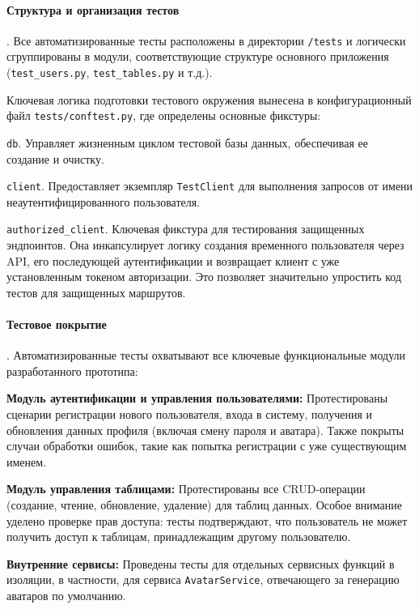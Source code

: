 \paragraph{Структура и организация тестов}. Все автоматизированные тесты расположены в директории
\verb|/tests| и логически сгруппированы в модули, соответствующие структуре основного приложения
(\verb|test_users.py|, \verb|test_tables.py| и т.д.).

Ключевая логика подготовки тестового окружения вынесена в конфигурационный файл
\verb|tests/conftest.py|, где определены основные фикстуры:
\begin{compactitem}
      \item \verb|db|. Управляет жизненным циклом тестовой базы данных, обеспечивая ее создание и
      очистку.
      \item \verb|client|. Предоставляет экземпляр \verb|TestClient| для выполнения запросов от имени
      неаутентифицированного пользователя.
      \item \verb|authorized_client|. Ключевая фикстура для тестирования защищенных эндпоинтов. Она
      инкапсулирует логику создания временного пользователя через API, его последующей аутентификации
      и возвращает клиент с уже установленным токеном авторизации. Это позволяет значительно
      упростить код тестов для защищенных маршрутов.
\end{compactitem}

\paragraph{Тестовое покрытие}. Автоматизированные тесты охватывают все ключевые функциональные модули
разработанного прототипа:
\begin{compactitem}
      \item \textbf{Модуль аутентификации и управления пользователями:} Протестированы сценарии
      регистрации нового пользователя, входа в систему, получения и обновления данных профиля
      (включая смену пароля и аватара). Также покрыты случаи обработки ошибок, такие как попытка
      регистрации с уже существующим именем.
      \item \textbf{Модуль управления таблицами:} Протестированы все CRUD-операции
      (создание, чтение, обновление, удаление) для таблиц данных. Особое внимание уделено проверке
      прав доступа: тесты подтверждают, что пользователь не может получить доступ к таблицам,
      принадлежащим другому пользователю.
      \item \textbf{Внутренние сервисы:} Проведены тесты для отдельных сервисных функций в изоляции, в
      частности, для сервиса \verb|AvatarService|, отвечающего за генерацию аватаров по умолчанию.
\end{compactitem}

